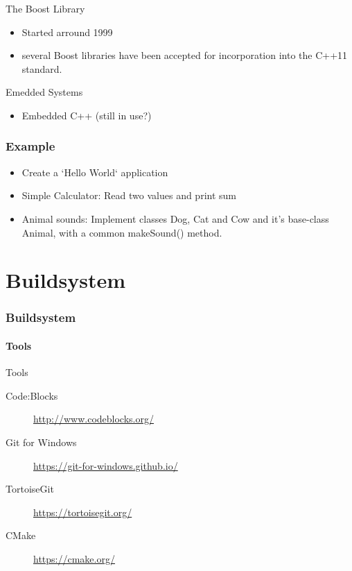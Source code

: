 \documentclass{beamer}
\begin{document}
\begin{frame}{The Boost Library}
\begin{itemize}
  \item Started arround 1999
  \item several Boost libraries have been accepted for incorporation into the
  C++11 standard.
\end{itemize}
\end{frame}

\begin{frame}{Emedded Systems}
\begin{itemize}
  \item Embedded C++ (still in use?)
\end{itemize}
\end{frame}

\section{Example}
\begin{frame}
\begin{itemize}
  \item Create a `Hello World` application
  \item Simple Calculator: Read two values and print sum
  \item Animal sounds: Implement classes Dog, Cat and Cow and it's base-class
  Animal, with a common makeSound() method.
\end{itemize}

\end{frame}

\part{Buildsystem}

\section{Buildsystem}
\subsection{Tools}
\begin{frame}{Tools}
\begin{description}
  \item[Code:Blocks] \url{http://www.codeblocks.org/}
  \item[Git for Windows] \url{https://git-for-windows.github.io/}
  \item[TortoiseGit] \url{https://tortoisegit.org/}
  \item[CMake] \url{https://cmake.org/}  
\end{description}

\end{frame}
\end{document}

